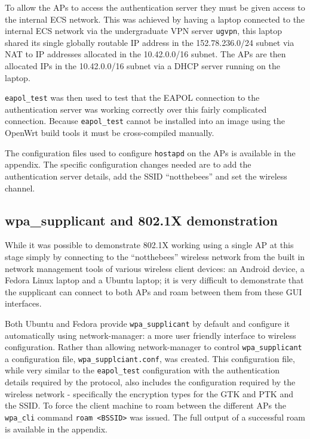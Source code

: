\documentclass[pdftex, 12pt, a4paper]{article}
\begin{document}
To allow the APs to access the authentication server they must be given access to the internal ECS network.  This was achieved by having a laptop connected to the internal ECS network via the undergraduate VPN server \verb`ugvpn`, this laptop shared its single globally routable IP address in the 152.78.236.0/24 subnet via NAT to IP addresses allocated in the 10.42.0.0/16 subnet.  The APs are then allocated IPs in the 10.42.0.0/16 subnet via a DHCP server running on the laptop.


\verb`eapol_test` was then used to test that the EAPOL connection to the authentication server was working correctly over this fairly complicated connection.  Because \verb`eapol_test` cannot be installed into an image using the OpenWrt build tools it must be cross-compiled manually.

The configuration files used to configure \verb`hostapd` on the APs is available in the appendix.  The specific configuration changes needed are to add the authentication server details, add the SSID ``notthebees'' and set the wireless channel.

\subsection{wpa\_supplicant and 802.1X demonstration}
While it was possible to demonstrate 802.1X working using a single AP at this stage simply by connecting to the ``notthebees'' wireless network from the built in network management tools of various wireless client devices: an Android device, a Fedora Linux laptop and a Ubuntu laptop; it is very difficult to demonstrate that the supplicant can connect to both APs and roam between them from these GUI interfaces.

Both Ubuntu and Fedora provide \verb`wpa_supplicant` by default and configure it automatically using network-manager: a more user friendly interface to wireless configuration.  Rather than allowing network-manager to control \verb`wpa_supplicant` a configuration file, \verb`wpa_supplciant.conf`, was created. This configuration file, while very similar to the \verb`eapol_test` configuration with the authentication details required by the protocol, also includes the configuration required by the wireless network - specifically the encryption types for the GTK and PTK and the SSID.  To force the client machine to roam between the different APs the \verb`wpa_cli` command \verb`roam <BSSID>` was issued.  The full output of a successful roam is available in the appendix.
\end{document}
